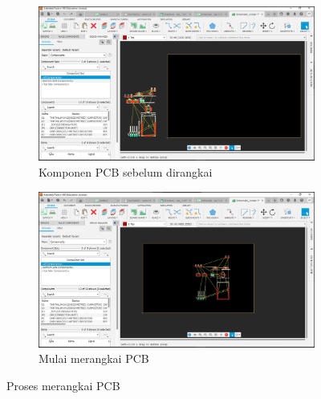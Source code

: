 \begin{figure}[H]
  \centering
  \begin{subfigure}[b]{0.4\linewidth}
    \centering
    \includegraphics[width=\linewidth]{img/modul_1/circuit before1.jpeg}
    \caption{Komponen PCB sebelum dirangkai\label{fig:inisub1}}
  \end{subfigure}
  \hspace{1cm}
  \begin{subfigure}[b]{0.4\linewidth}
    \centering
    \includegraphics[width=\linewidth]{img/modul_1/circuit before.jpeg}
    \caption{Mulai merangkai PCB\label{fig:inisub2}}
  \end{subfigure}
  \caption{Proses merangkai PCB\label{fig:keduagambar}}
\end{figure}

